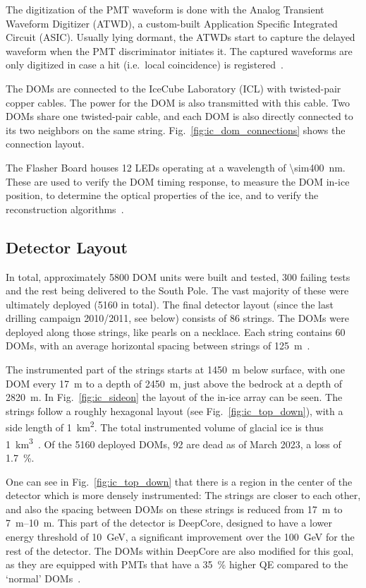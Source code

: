 The digitization of the PMT waveform is done with the Analog Transient Waveform Digitizer (ATWD), a custom-built Application Specific Integrated Circuit (ASIC). Usually lying dormant, the ATWDs start to capture the delayed waveform when the PMT discriminator initiates it. The captured waveforms are only digitized in case a hit (i.e.\ local coincidence) is registered~\cite{Aartsen2017}.

The DOMs are connected to the IceCube Laboratory (ICL) with twisted-pair copper cables. The power for the DOM is also transmitted with this cable. Two DOMs share one twisted-pair cable, and each DOM is also directly connected to its two neighbors on the same string. Fig.~\ref{fig:ic_dom_connections} shows the connection layout.

The Flasher Board houses 12 LEDs operating at a wavelength of \SI{\sim400}{\nm}. These are used to verify the DOM timing response, to measure the DOM in-ice position, to determine the optical properties of the ice, and to verify the reconstruction algorithms~\cite{Aartsen2017}.

\subsection{Detector Layout}
In total, approximately 5800 DOM units were built and tested, 300 failing tests and the rest being delivered to the South Pole. The vast majority of these were ultimately deployed (5160 in total). The final detector layout (since the last drilling campaign 2010/2011, see below) consists of 86 strings. The DOMs were deployed along those strings, like pearls on a necklace. Each string contains 60 DOMs, with an average horizontal spacing between strings of \SI{125}{\meter}~\cite{Aartsen2017}.

The instrumented part of the strings starts at \SI{1450}{\m} below surface, with one DOM every \SI{17}{\m} to a depth of \SI{2450}{\m}, just above the bedrock at a depth of \SI{2820}{\m}. In Fig.~\ref{fig:ic_sideon} the layout of the in-ice array can be seen. The strings follow a roughly hexagonal layout (see Fig.~\ref{fig:ic_top_down}), with a side length of \SI{1}{\km\squared}. The total instrumented volume of glacial ice is thus \SI{1}{\km\cubed}~\cite{Aartsen2017}. Of the 5160 deployed DOMs, 92 are dead as of March 2023, a loss of \SI{1.7}{\percent}.

One can see in Fig.~\ref{fig:ic_top_down} that there is a region in the center of the detector which is more densely instrumented: The strings are closer to each other, and also the spacing between DOMs on these strings is reduced from \SI{17}{\m} to \SIrange{7}{10}{\m}. This part of the detector is DeepCore, designed to have a lower energy threshold of \SI{10}{\GeV}, a significant improvement over the \SI{100}{\GeV} for the rest of the detector. The DOMs within DeepCore are also modified for this goal, as they are equipped with PMTs that have a \SI{35}{\percent} higher QE compared to the `normal' DOMs~\cite{Aartsen2017}.

